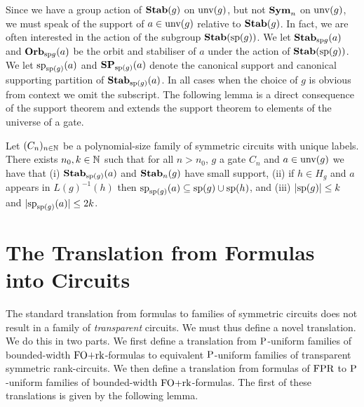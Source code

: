 \documentclass[a4paper,UKenglish]{lipics-v2018}
\begin{document}
Since we have a group action of $\text{\textbf{Stab}}(g)$ on $\text{unv}(g)$, but not $\text{\textbf{Sym}}_n$
on $\text{unv}(g)$, we must speak of the support of $a \in \text{unv}(g)$ relative
to $\text{\textbf{Stab}}(g)$. In fact, we are often interested in the action of the subgroup
$\text{\textbf{Stab}} (\text{sp} (g))$. We let $\text{\textbf{Stab}}_{\text{sp}{g}}(a)$ and $\text{\textbf{Orb}}_{\text{sp}{g}}(a)$ be the
orbit and stabiliser of $a$ under the action of $\text{\textbf{Stab}} (\text{sp} (g))$. We let
$\text{sp}_{\text{sp}(g)}(a)$ and $\text{\textbf{SP}}_{\text{sp}(g)}(a)$ denote the canonical support
and canonical supporting partition of $\text{\textbf{Stab}}_{\text{sp}(g)}(a)$. In all cases when
the choice of $g$ is obvious from context we omit the subscript. The following
lemma is a direct consequence of the support theorem and extends the support
theorem to elements of the universe of a gate.

\begin{lemma}
  \label{lem:row-column-supports}
  Let $(C_n)_{n \in \mathbb{N}}$ be a polynomial-size family of symmetric circuits
  with unique labels. There exists $n_0, k \in \mathbb{N}$ such that for all $n >
  n_0$, $g$ a gate $C_n$ and $a \in \text{unv}(g)$ we have that (i)
  $\text{\textbf{Stab}}_{\text{sp}(g)}(a)$ and $\text{\textbf{Stab}}_{n}(g)$ have small support, (ii) if $h \in
  H_g$ and $a$ appears in $L(g)^{-1}(h)$ then $\text{sp}_{\text{sp}(g)}(a) \subseteq
  \text{sp}(g) \cup \text{sp}(h)$, and (iii) $\vert \text{sp}(g) \vert \leq k$ and $\vert
  \text{sp}_{\text{sp}(g)}(a) \vert \leq 2k$.
\end{lemma}

\section{The Translation from Formulas into
  Circuits}\label{sec:formulas-to-circuits}
The standard translation from formulas to families of symmetric circuits does
not result in a family of \emph{transparent} circuits. We must thus define a
novel translation. We do this in two parts. We first define a translation from
$\mathrm{P}$-uniform families of bounded-width $\text{\upshape FO+rk}$-formulas to equivalent
$\mathrm{P}$-uniform families of transparent symmetric rank-circuits. We then define a
translation from formulas of $\text{\upshape FPR}$ to $\mathrm{P}$-uniform families of bounded-width
$\text{\upshape FO+rk}$-formulas. The first of these translations is given by the following
lemma.
\end{document}

